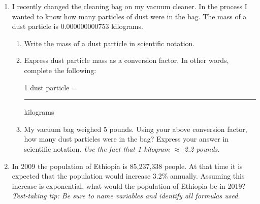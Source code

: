 \documentclass[12pt]{article}
\begin{document}
\begin{enumerate}
\newpage
\item I recently changed the cleaning bag on my vacuum cleaner.  In the process I wanted to know how many particles of dust were in the bag.  The mass of a dust particle is 0.000000000753 kilograms.

\begin{enumerate}
\item Write the mass of a dust particle in scientific notation.
\vfill
\item Express dust particle mass as a conversion factor.  In other words, complete the following:
\vspace{0.2in}
\begin{center} 1 dust particle = \rule{1.5in}{.01in} kilograms \end{center}
\vspace{0.2in}

\item My vacuum bag weighed 5 pounds. Using your above conversion factor,  how many dust particles were in the bag? Express your answer in scientific notation.  \emph{Use the fact that 1 kilogram $\approx$ 2.2 pounds.}
\vfill
\end{enumerate}

\item In 2009 the population of Ethiopia is 85,237,338 people.  At that time it is expected that the population would increase 3.2\% annually.  Assuming this increase is exponential, what would the population of Ethiopia be in 2019?  \emph{Test-taking tip: Be sure to name variables and identify all formulas used.}
\vfill


\end{enumerate}
\end{document}
